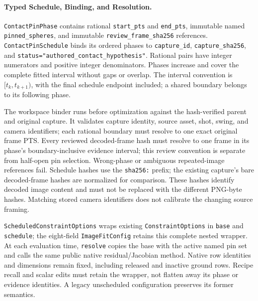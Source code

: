 \documentclass[11pt,letterpaper]{article}
\newcommand{\code}[1]{\nolinkurl{#1}}
\begin{document}
\paragraph{Typed Schedule, Binding, and Resolution.}
\code{ContactPinPhase} contains rational \code{start_pts} and \code{end_pts},
immutable named \code{pinned_spheres}, and immutable
\code{review_frame_sha256} references. \code{ContactPinSchedule} binds its
ordered phases to \code{capture_id}, \code{capture_sha256}, and
\code{status="authored_contact_hypothesis"}. Rational pairs have integer
numerators and positive integer denominators. Phases increase and cover the
complete fitted interval without gaps or overlap. The interval convention is
$[t_k,t_{k+1})$, with the final schedule endpoint included; a shared boundary
belongs to its following phase.

The workspace binder runs before optimization against the hash-verified
parent and original capture. It validates capture identity, source asset,
shot, swing, and camera identifiers; each rational boundary must resolve to
one exact original frame PTS. Every reviewed decoded-frame hash must resolve
to one frame in its phase's boundary-inclusive evidence interval; this review
convention is separate from half-open pin selection. Wrong-phase or ambiguous repeated-image
references fail. Schedule hashes use the \code{sha256:} prefix; the existing
capture's bare decoded-frame hashes are normalized for comparison. These
hashes identify decoded image content and must not be replaced with the
different PNG-byte hashes. Matching stored camera identifiers does not
calibrate the changing source framing.

\code{ScheduledConstraintOptions} wraps existing \code{ConstraintOptions}
in \code{base} and \code{schedule}; the eight-field \code{ImageFitConfig}
retains this complete nested wrapper. At each evaluation time,
\code{resolve} copies the base with the active named pin set and calls the
same public native residual/Jacobian method. Native row identities and
dimensions remain fixed, including released and inactive ground rows.
Recipe recall and scalar edits must retain the wrapper, not flatten away its
phase or evidence identities. A legacy unscheduled configuration preserves
its former semantics.
\end{document}
